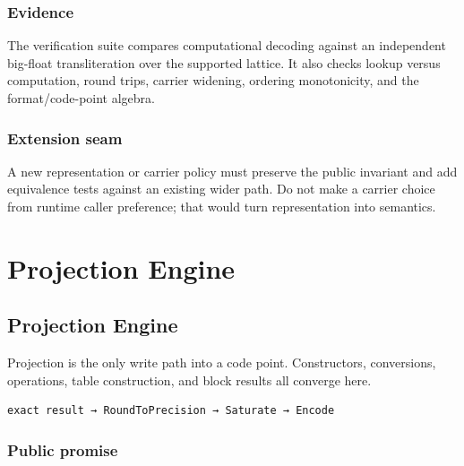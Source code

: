 \subsection{Evidence}



\label{13132603241474770426}{}


The verification suite compares computational decoding against an independent big-float transliteration over the supported lattice. It also checks lookup versus computation, round trips, carrier widening, ordering monotonicity, and the format/code-point algebra.



\subsection{Extension seam}



\label{12435378766327693060}{}


A new representation or carrier policy must preserve the public invariant and add equivalence tests against an existing wider path. Do not make a carrier choice from runtime caller preference; that would turn representation into semantics.



\chapter{Projection Engine}


\section{Projection Engine}



\label{13743789692913687987}{}


Projection is the only write path into a code point. Constructors, conversions, operations, table construction, and block results all converge here.




\begin{verbatim}
exact result → RoundToPrecision → Saturate → Encode
\end{verbatim}



\subsection{Public promise}



